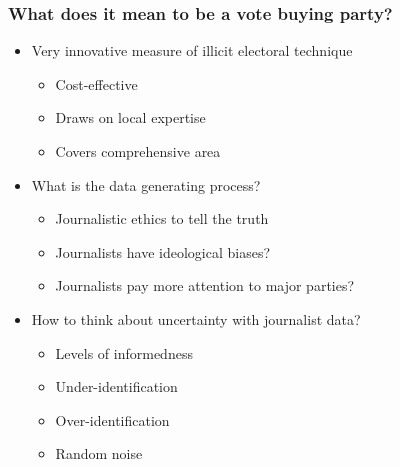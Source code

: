 \documentclass{beamer}
\begin{document}
\begin{frame}
\frametitle{What does it mean to be a vote buying party?}

\begin{itemize}
\item Very innovative measure of illicit electoral technique
\begin{itemize}
\item Cost-effective 
\item Draws on local expertise
\item Covers comprehensive area
\end{itemize}
\item What is the data generating process?
\begin{itemize}
\item Journalistic ethics to tell the truth
\item Journalists have ideological biases?
\item Journalists pay more attention to major parties?
\end{itemize}
\item How to think about uncertainty with journalist data?
\begin{itemize}
\item Levels of informedness
\item Under-identification
\item Over-identification
\item Random noise
\end{itemize}
\end{itemize}
 
\end{frame}
\end{document}
